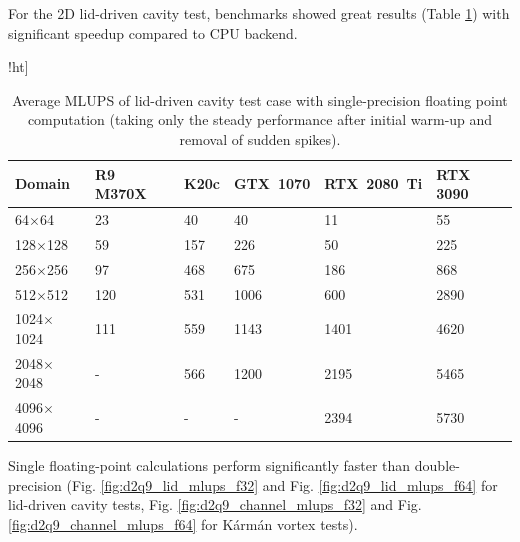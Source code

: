 For the 2D lid-driven cavity test, benchmarks showed great results (Table \ref{tab:lid-mlups-all}) with significant speedup compared to CPU backend.

\begin{table}!ht]
	\centering
	\begin{tabular}{ |p{1.7cm}||p{1.6cm}|p{0.9cm}|p{1.5cm}|p{1.7cm}|p{1.5cm}|  }
		\hline
		Domain & R9 M370X & K20c & GTX~1070 & RTX~2080~Ti & RTX 3090 \\
		\hline
		64$\times$64   & 23 & 40 & 40  & 11  & 55  \\
		128$\times$128   & 59 & 157 & 226  & 50   & 225  \\
		256$\times$256   & 97 & 468 & 675  & 186   & 868  \\
		512$\times$512   & 120 & 531 & 1006  & 600   & 2890  \\
		1024$\times$1024   & 111 & 559 & 1143   & 1401   & 4620  \\
		2048$\times$2048   & - & 566 & 1200  & 2195  & 5465  \\
		4096$\times$4096   & - & - & -  & 2394  & 5730  \\
		\hline
	\end{tabular}
	\caption{Average MLUPS of lid-driven cavity test case with single-precision floating point computation (taking only the steady performance after initial warm-up and removal of sudden spikes).}
	\label{tab:lid-mlups-all}
\end{table}

Single floating-point calculations perform significantly faster than double-precision (Fig. \ref{fig:d2q9_lid_mlups_f32} and Fig. \ref{fig:d2q9_lid_mlups_f64} for lid-driven cavity tests, Fig. \ref{fig:d2q9_channel_mlups_f32} and Fig. \ref{fig:d2q9_channel_mlups_f64} for Kármán vortex tests).

